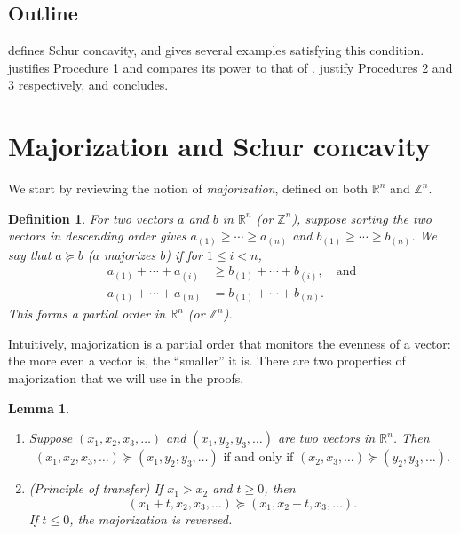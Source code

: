 \documentclass[11pt]{article}
\newtheorem{definition}{Definition}
\newtheorem{lemma}[corollary]{Lemma}
\theoremstyle{definition}
\theoremstyle{custom}
\newcommand{\RR}{\mathbb{R}}
\newcommand{\ZZ}{\mathbb{Z}}
\begin{document}
\subsection{Outline}

 defines Schur concavity, and gives several examples satisfying this condition.  justifies Procedure 1 and compares its power to that of \citet{Gupta:1967wg}.  justify Procedures 2 and 3 respectively, and  concludes.

\section{Majorization and Schur concavity}
\label{sec:maj}

We start by reviewing the notion of {\em majorization}, defined on both $\RR^n$ and $\ZZ^n$.

\begin{definition}
For two vectors $a$ and $b$ in $\RR^n$ (or $\ZZ^n$), suppose sorting the two vectors in descending order gives
$a_{\left(1\right)} \ge \cdots \ge a_{\left(n\right)}$ and $b_{\left(1\right)} \ge \cdots \ge b_{\left(n\right)}$. We say that $a \succeq b$ ($a$ majorizes $b$) if for $1 \le i < n$,
\begin{align*}
a_{\left(1\right)} + \cdots + a_{\left(i\right)} & \ge b_{\left(1\right)} + \cdots + b_{\left(i\right)}, \quad \text{and}\\
a_{\left(1\right)} + \cdots + a_{\left(n\right)} & = b_{\left(1\right)} + \cdots + b_{\left(n\right)}.
\end{align*}
This forms a partial order in $\RR^n$ (or $\ZZ^n$).
\end{definition}

Intuitively, majorization is a partial order that monitors the evenness of a vector: the more even a vector is, the ``smaller'' it is. There are two properties of majorization that we will use in the proofs.

\begin{lemma}~\\
\begin{enumerate}
\item Suppose $\left(x_1, x_2, x_3, \ldots\right)$ and $\left(x_1, y_2, y_3, \ldots\right)$ are two vectors in $\RR^n$. Then
$$\left(x_1, x_2, x_3, \ldots\right) \succeq \left(x_1, y_2, y_3, \ldots\right) \text{ if and only if } \left(x_2, x_3, \ldots\right) \succeq \left(y_2, y_3, \ldots\right).$$
\item (Principle of transfer) If $x_1 > x_2$ and $t \ge 0$, then
$$\left(x_1 + t, x_2, x_3, \ldots\right) \succeq \left(x_1, x_2 + t, x_3, \ldots\right).$$
If $t \le 0$, the majorization is reversed.
\end{enumerate}
\label{lma:twoprop}
\end{lemma}
\end{document}
